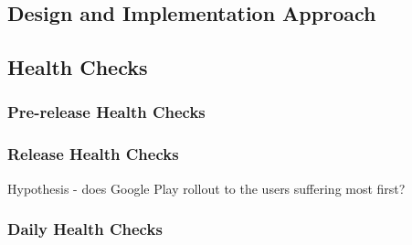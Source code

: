 \subsection{Design and Implementation Approach}

\subsection{Health Checks}

\subsubsection{Pre-release Health Checks}


\subsubsection{Release Health Checks}

Hypothesis - does Google Play rollout to the users suffering most first?

\subsubsection{Daily Health Checks}